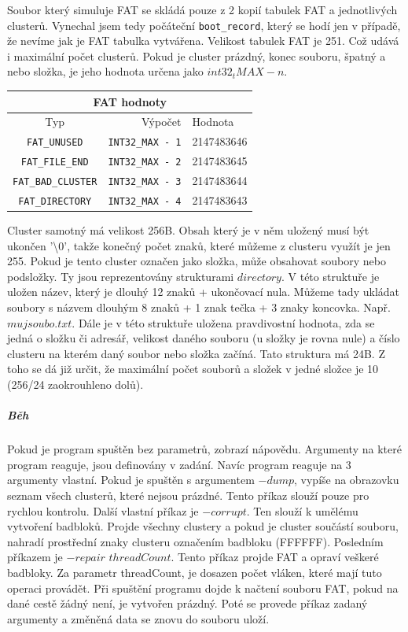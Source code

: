 \documentclass[12pt, a4paper]{article}
\begin{document}
Soubor který simuluje FAT se skládá pouze z 2 kopií tabulek FAT a jednotlivých clusterů. Vynechal jsem tedy počáteční \texttt{boot\_record}, který se hodí jen v případě, že nevíme jak je FAT tabulka vytvářena. Velikost tabulek FAT je 251. Což udává i maximální počet clusterů. Pokud je cluster prázdný, konec souboru, špatný a nebo složka, je jeho hodnota určena jako $int32_t MAX - n$. 

\begin{table}
\centering
\begin{tabular}{ |c|r|l| }
 \hline
 \multicolumn{3}{|c|}{FAT hodnoty} \\
 \hline
 Typ & Výpočet & Hodnota\\
 \hline
\texttt{FAT\_UNUSED} & \texttt{INT32\_MAX - 1} & 2147483646\\
\texttt{FAT\_FILE\_END} & \texttt{INT32\_MAX - 2} & 2147483645\\
\texttt{FAT\_BAD\_CLUSTER} & \texttt{INT32\_MAX - 3} & 2147483644\\
\texttt{FAT\_DIRECTORY} & \texttt{INT32\_MAX - 4} & 2147483643\\
 \hline
\end{tabular}

\end{table}
Cluster samotný má velikost 256B. Obsah který je v něm uložený musí být ukončen '\textbackslash 0', takže konečný počet znaků, které můžeme z clusteru využít je jen 255. Pokud je tento cluster označen jako složka, může obsahovat soubory nebo podsložky. Ty jsou reprezentovány strukturami $directory$. V této struktuře je uložen název, který je dlouhý 12 znaků + ukončovací nula. Můžeme tady ukládat soubory s názvem dlouhým 8 znaků + 1 znak tečka + 3 znaky koncovka. Např. $mujsoubo.txt$. Dále je v této struktuře uložena pravdivostní hodnota, zda se jedná o složku či adresář, velikost daného souboru (u složky je rovna nule) a číslo clusteru na kterém daný soubor nebo složka začíná. Tato struktura má 24B. Z toho se dá již určit, že maximální počet souborů a složek v jedné složce je 10 (256/24 zaokrouhleno dolů).
\subparagraph{Běh}
Pokud je program spuštěn bez parametrů, zobrazí nápovědu. Argumenty na které program reaguje, jsou definovány v zadání. Navíc program reaguje na 3 argumenty vlastní. Pokud je spuštěn s argumentem $-dump$, vypíše na obrazovku seznam všech clusterů, které nejsou prázdné. Tento příkaz slouží pouze pro rychlou kontrolu. Další vlastní příkaz je $-corrupt$. Ten slouží k umělému vytvoření badbloků. Projde všechny clustery a pokud je cluster součástí souboru, nahradí prostřední znaky clusteru označením badbloku (FFFFFF). Posledním příkazem je $-repair$ $threadCount$. Tento příkaz projde FAT a opraví veškeré badbloky. Za parametr threadCount, je dosazen počet vláken, které mají tuto operaci provádět. Při spuštění programu dojde k načtení souboru FAT, pokud na dané cestě žádný není, je vytvořen prázdný. Poté se provede příkaz zadaný argumenty a změněná data se znovu do souboru uloží.
\end{document}

